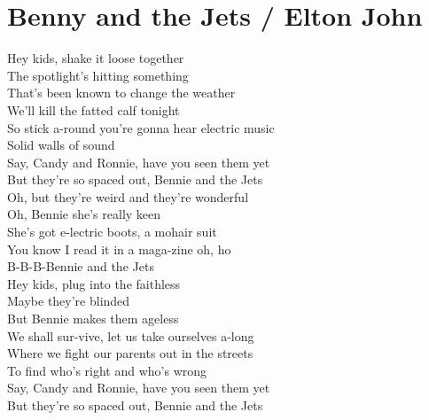 \section{Benny and the Jets / Elton John}\label{sec:bennyandthejets}

  \Aminor
  \AmajorSeven
  \Bminor
  \BminorSeven
  \Cmajor
  \Cseven
  \DmajorEasy
  \Eminor
  \FmajorSeven
  \Gmajor
  \GmajorSeven
  
  
 Hey kids,  shake it loose together\\
The  spotlight's hitting something\\
That's been  known to change the weather\\
 We'll kill the fatted  calf tonight\\
So stick a-round you're  gonna hear electric  music\\
Solid walls of  sound\\
Say,  Candy and Ronnie, have you seen them yet\\
 But they're so spaced out,  Bennie and the  Jets\\
 Oh, but they're weird and they're wonderful\\
Oh,  Bennie she's really keen\\
She's got e-lectric boots, a  mohair suit\\
You know I  read it in a maga-zine oh,  ho\\
 B-B-B-Bennie and the  Jets  \\
 Hey kids,  plug into the faithless\\
 Maybe they're blinded\\
But  Bennie makes them ageless\\
 We shall sur-vive, let us take ourselves a-long\\
Where we  fight our parents out in the  streets\\
To find who's right and who's  wrong\\
Say,  Candy and Ronnie, have you seen them yet\\
 But they're so spaced out,  Bennie and the  Jets\\

